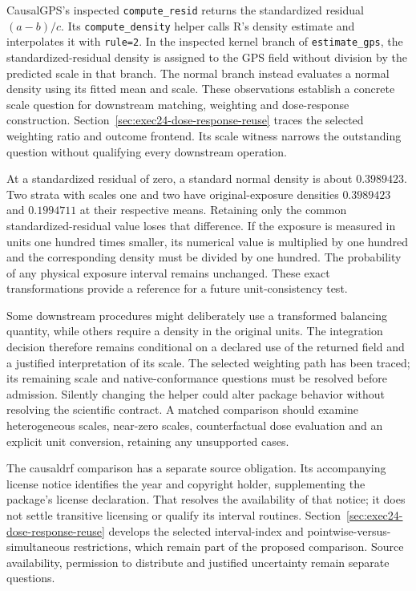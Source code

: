 CausalGPS's inspected \texttt{compute\_resid} returns the standardized residual
$(a-b)/c$. Its \texttt{compute\_density} helper calls R's density estimate and
interpolates it with \texttt{rule=2}. In the inspected kernel branch of
\texttt{estimate\_gps}, the standardized-residual density is assigned to the
GPS field without division by the predicted scale in that branch. The normal
branch instead evaluates a normal density using its fitted mean and scale.
These observations establish a concrete scale question for downstream matching,
weighting and dose-response construction. Section~\ref{sec:exec24-dose-response-reuse}
traces the selected weighting ratio and outcome frontend. Its scale witness
narrows the outstanding question without qualifying every downstream operation. \cite{v13_sw_causalgps,v131_sw_causalgps}

At a standardized residual of zero, a standard normal density is about
$0.3989423$. Two strata with scales one and two have original-exposure densities
$0.3989423$ and $0.1994711$ at their respective means. Retaining only the common
standardized-residual value loses that difference. If the exposure is measured
in units one hundred times smaller, its numerical value is multiplied by one
hundred and the corresponding density must be divided by one hundred. The
probability of any physical exposure interval remains unchanged. These exact
transformations provide a reference for a future unit-consistency test.
\cite{v131_project_semantics}

Some downstream procedures might deliberately use a transformed balancing
quantity, while others require a density in the original units. The integration decision therefore remains conditional on a declared use of
the returned field and a justified interpretation of its scale. The selected
weighting path has been traced; its remaining scale and native-conformance
questions must be resolved before admission. Silently changing the helper
could alter package behavior without resolving the scientific contract. A
matched comparison should examine heterogeneous scales, near-zero scales,
counterfactual dose evaluation and an explicit unit conversion, retaining any
unsupported cases.

The causaldrf comparison has a separate source obligation. Its accompanying
license notice identifies the year and copyright holder, supplementing the
package's license declaration. That resolves the availability of that notice;
it does not settle transitive licensing or qualify its interval routines.
Section~\ref{sec:exec24-dose-response-reuse} develops the selected interval-index
and pointwise-versus-simultaneous restrictions, which remain part of the
proposed comparison. Source availability, permission to distribute and justified
uncertainty remain separate questions. \cite{v131_sw_causaldrf}

